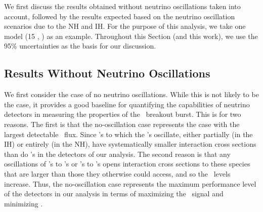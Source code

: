 
We first discuss the results obtained without neutrino oscillations
taken into account, followed by the results expected based on the
neutrino oscillation scenarios due to the NH and IH. For
the purpose of this analysis, we take one model (15 \Msol, \ls) as an
example. 
Throughout this Section (and this work), we use the 95\% uncertainties
as the basis for our discussion.

\subsection{Results Without Neutrino Oscillations}

We first consider the case of no neutrino oscillations.  While this is
not likely to be the case, it provides a good baseline for
quantifying the capabilities of neutrino detectors in measuring the
properties of the \nue\ breakout burst.  This
is for two reasons. The first is that the no-oscillation case 
represents the case with
the largest detectable \nue\ flux. Since \nuxpart's to which the \nue's
oscillate, either partially (in the IH) or entirely (in the NH), 
have systematically smaller interaction cross sections
than do \nue's in the detectors of our analysis. The 
second reason is that 
any oscillations of \nuxpart's to \nue's or \nuxanti's to \anue's opens 
interaction cross sections to these species that are larger than those 
they otherwise could access, and so the \background\ levels increase.
 Thus, the no-oscillation case represents the
maximum performance level of the detectors in our analysis in terms of
maximizing the \nue\ signal and minimizing \backgrounds.


